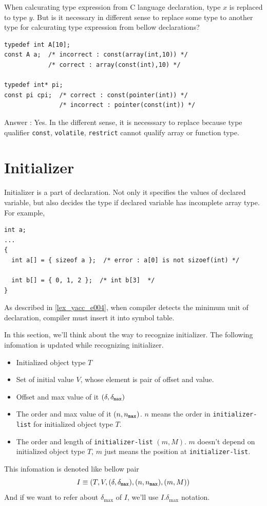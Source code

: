 \begin{QandA}
When calcurating type expression from C language declaration,
type $x$ is replaced to type $y$. But is it necessary in different sense to
replace
some type to another type for calcurating type expression
from bellow declarations?

\begin{verbatim}
typedef int A[10];
const A a;  /* incorrect : const(array(int,10)) */
            /* correct : array(const(int),10) */

typedef int* pi;
const pi cpi;  /* correct : const(pointer(int)) */
               /* incorrect : pointer(const(int)) */
\end{verbatim}

Answer : Yes. In the different sense, it is necesssary
to replace because type qualifier
 {\tt{const}}, {\tt{volatile}}, {\tt{restrict}}
cannot qualify array or function type.
\end{QandA}

\section{Initializer}
\label{decl_e005}
Initializer is a part of declaration.
Not only it specifies the values of declared variable, but also
decides the type if declared variable has incomplete array type.
For example,
\begin{verbatim}
int a;
...
{
  int a[] = { sizeof a };  /* error : a[0] is not sizoef(int) */

  int b[] = { 0, 1, 2 };  /* int b[3]  */
}
\end{verbatim}
As described in \ref{lex_yacc_e004},
when compiler detects the minimum unit of declaration,
compiler must insert it into symbol table.

In this section, we'll think about the way to recognize
initializer. The following infomation is updated
while recognizing initializer.
\begin{itemize}
\item Initialized object type $T$
\item Set of initial value $V$, whose element is pair of offset and value.
\item Offset and max value of it $({\delta},{\delta}_{\tt{max}})$
\item The order and max value of it $(n,n_{\tt{max}})$.
      $n$ means the order in {\tt{initializer-list}} for initialized
      object type $T$.
\item The order and length of {\tt{initializer-list}} $(m,M)$.
      $m$ doesn't depend on initialized object type $T$,
      $m$ just means the position
      at {\tt{initializer-list}}. 
\end{itemize}
This infomation is denoted like bellow pair
\[
I \equiv (T,V,({\delta},{\delta}_{\tt{max}}),(n,n_{\tt{max}}),(m,M)) 
\]
And if we want to refer about $\delta_{\max}$ of $I$, we'll
use  $I.\delta_{\max}$ notation.

